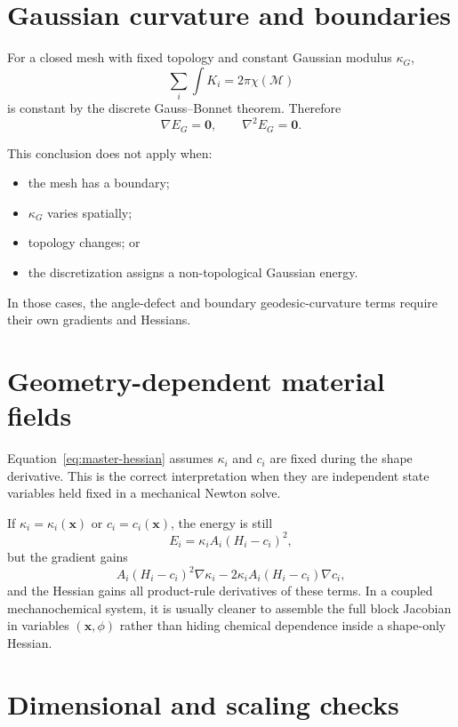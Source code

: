 \documentclass[11pt]{article}
\newcommand{\grad}{\nabla}
\newcommand{\Hess}{\nabla^2}
\newcommand{\zero}{\mathbf{0}}
\newcommand{\x}{\mathbf{x}}
\begin{document}
\section{Gaussian curvature and boundaries}

For a closed mesh with fixed topology and constant Gaussian modulus $\kappa_G$,
\begin{equation}
  \sum_i\int K_i
  =2\pi\chi(\mathcal{M})
\end{equation}
is constant by the discrete Gauss--Bonnet theorem.  Therefore
\begin{equation}
  \grad E_G=\zero,
  \qquad
  \Hess E_G=\zero.
\end{equation}

This conclusion does not apply when:
\begin{itemize}
  \item the mesh has a boundary;
  \item $\kappa_G$ varies spatially;
  \item topology changes; or
  \item the discretization assigns a non-topological Gaussian energy.
\end{itemize}
In those cases, the angle-defect and boundary geodesic-curvature terms require their own gradients and Hessians.

\section{Geometry-dependent material fields}

Equation~\eqref{eq:master-hessian} assumes $\kappa_i$ and $c_i$ are fixed during the shape derivative.  This is the correct interpretation when they are independent state variables held fixed in a mechanical Newton solve.

If $\kappa_i=\kappa_i(\x)$ or $c_i=c_i(\x)$, the energy is still
\begin{equation}
  E_i=\kappa_iA_i(H_i-c_i)^2,
\end{equation}
but the gradient gains
\begin{equation}
  A_i(H_i-c_i)^2\grad\kappa_i
  -2\kappa_iA_i(H_i-c_i)\grad c_i,
\end{equation}
and the Hessian gains all product-rule derivatives of these terms.  In a coupled mechanochemical system, it is usually cleaner to assemble the full block Jacobian in variables $(\x,\phi)$ rather than hiding chemical dependence inside a shape-only Hessian.

\section{Dimensional and scaling checks}
\end{document}
